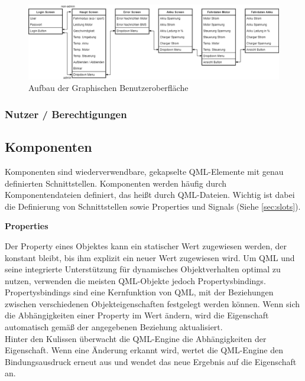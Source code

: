 \begin{figure}[H]
	\begin{center}
		\includegraphics[scale=0.4]{figures/hcis/gui_aufbau.png}
		\caption{Aufbau der Graphischen Benutzeroberfläche}
		\label{fig:aufbauGUI}
	\end{center}
\end{figure}

\newpage

\subsubsection{Nutzer / Berechtigungen}

\subsection{Komponenten}

Komponenten sind wiederverwendbare, gekapselte QML-Elemente mit genau definierten Schnittstellen. Komponenten werden häufig durch Komponentendateien definiert, das heißt durch QML-Dateien. Wichtig ist dabei die Definierung von Schnittstellen sowie Properties und Signals (Siehe \ref{sec:slots}).\\\medskip
\begin{large}
\textbf{Properties}\\\medskip
\end{large}

Der Property eines Objektes kann ein statischer Wert zugewiesen werden, der konstant bleibt, bis ihm explizit ein neuer Wert zugewiesen wird. Um QML und seine integrierte Unterstützung für dynamisches Objektverhalten optimal zu nutzen, verwenden die meisten QML-Objekte jedoch Propertysbindings.\\
Propertysbindings sind eine Kernfunktion von QML, mit der Beziehungen zwischen verschiedenen Objekteigenschaften festgelegt werden können. Wenn sich die Abhängigkeiten einer Property im Wert ändern, wird die Eigenschaft automatisch gemäß der angegebenen Beziehung aktualisiert.\\
Hinter den Kulissen überwacht die QML-Engine die Abhängigkeiten der Eigenschaft. Wenn eine Änderung erkannt wird, wertet die QML-Engine den Bindungsausdruck erneut aus und wendet das neue Ergebnis auf die Eigenschaft an.

